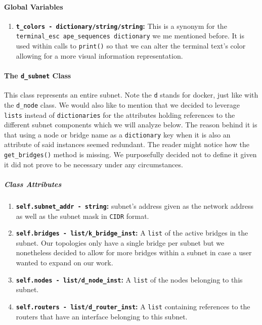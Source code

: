     \paragraph{Global Variables}
        \begin{enumerate}
            \item \textbf{\texttt{\allowbreak t\_colors - dictionary/string/string}:} This is a synonym for the \texttt{\allowbreak terminal\_esc ape\_sequences dictionary} we me mentioned before. It is used within calls to \texttt{print()} so that we can alter the terminal text's color allowing for a more visual information representation.
        \end{enumerate}

    \paragraph{The \texttt{d\_subnet} Class}
        This class represents an entire subnet. Note the \texttt{d} stands for docker, just like with the \texttt{d\_node} class. We would also like to mention that we decided to leverage \texttt{lists} instead of \texttt{dictionaries} for the attributes holding references to the different subnet components which we will analyze below. The reason behind it is that using a node or bridge name as a \texttt{dictionary} key when it is also an attribute of said instances seemed redundant. The reader might notice how the \texttt{get\_bridges()} method is missing. We purposefully decided not to define it given it did not prove to be necessary under any circumstances.

        \subparagraph{Class Attributes}
            \begin{enumerate}
                \item \textbf{\texttt{self.subnet\_addr - string}:} subnet's address given as the network address as well as the subnet mask in \texttt{CIDR} format.
                \item \textbf{\texttt{self.bridges - list/k\_bridge\_inst}:} A \texttt{list} of the active bridges in the subnet. Our topologies only have a single bridge per subnet but we nonetheless decided to allow for more bridges within a subnet in case a user wanted to expand on our work.
                \item \textbf{\texttt{self.nodes - list/d\_node\_inst}:} A \texttt{list} of the nodes belonging to this subnet.
                \item \textbf{\texttt{self.routers - list/d\_router\_inst}:} A \texttt{list} containing references to the routers that have an interface belonging to this subnet.
            \end{enumerate}

